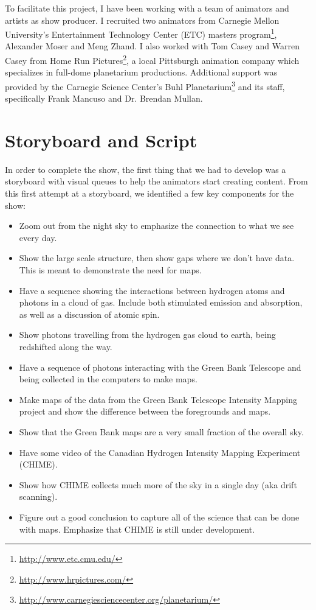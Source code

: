 To facilitate this project, I have been working with a team of animators and artists as show producer. I recruited two animators from Carnegie Mellon University's Entertainment Technology Center (ETC) masters program\footnote{\url{http://www.etc.cmu.edu/}}, Alexander Moser and Meng Zhand. I also worked with Tom Casey and Warren Casey from Home Run Pictures\footnote{\url{http://www.hrpictures.com/}}, a local Pittsburgh animation company which specializes in full-dome planetarium productions. Additional support was provided by the Carnegie Science Center's Buhl Planetarium\footnote{\url{http://www.carnegiesciencecenter.org/planetarium/}} and its staff, specifically Frank Mancuso and Dr. Brendan Mullan.

\section{Storyboard and Script}
In order to complete the show, the first thing that we had to develop was a storyboard with visual queues to help the animators start creating content. From this first attempt at a storyboard, we identified a few key components for the show:

\begin{itemize}
\item Zoom out from the night sky to emphasize the connection to what we see every day.
\item Show the large scale structure, then show gaps where we don't have data. This is meant to demonstrate the need for \cm maps.
\item Have a sequence showing the interactions between hydrogen atoms and \cm photons in a cloud of gas. Include both stimulated emission and absorption, as well as a discussion of atomic spin.
\item Show photons travelling from the hydrogen gas cloud to earth, being redshifted along the way. 
\item Have a sequence of photons interacting with the Green Bank Telescope and being collected in the computers to make maps.
\item Make maps of the data from the Green Bank Telescope Intensity Mapping project and show the difference between the foregrounds and \cm maps. 
\item Show that the Green Bank maps are a very small fraction of the overall sky.
\item Have some video of the Canadian Hydrogen Intensity Mapping Experiment (CHIME).
\item Show how CHIME collects much more of the sky in a single day (aka drift scanning). 
\item Figure out a good conclusion to capture all of the science that can be done with \cm maps. Emphasize that CHIME is still under development. 
\end{itemize}

